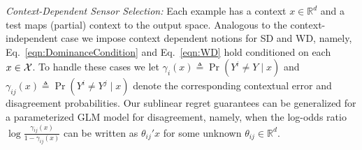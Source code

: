 \documentclass[11pt]{article} %
\newcommand{\todov}[2][]{\todo[color=Purple!20,size=\tiny,#1]{V: #2}}
\newcommand{\R}{\mathbb{R}} %
\begin{document}
\noindent
{\it Context-Dependent Sensor Selection:}
Each example has a context $x \in \R^d$ and a test maps (partial) context to the output space. Analogous to the context-independent case we impose context dependent notions for SD and WD, namely, Eq.~\ref{eqn:DominanceCondition} and Eq.~\ref{eqn:WD} hold conditioned on each $x \in {\cal X}$. To handle these cases we let $\gamma_i(x)\triangleq \Pr(Y^{i} \neq Y\mid x)$ and $\gamma_{ij}(x) \triangleq \Pr(Y^{i} \neq Y^{j}\mid x)$ denote the corresponding contextual error and disagreement probabilities. Our sublinear regret guarantees can be generalized for a parameterized GLM model for disagreement, namely, when the log-odds ratio $\log \frac{\gamma_{ij}(x)}{1-\gamma_{ij}(x)}$ can be written as $\theta_{ij}'x$ for some unknown $\theta_{ij} \in \mathbb{R}^d$.
\vspace{-5pt}
\end{document}
